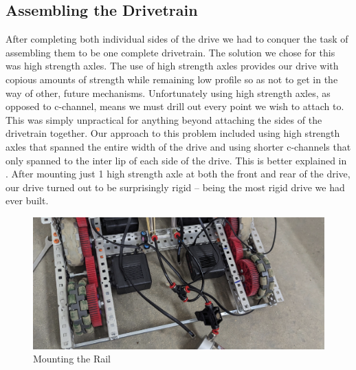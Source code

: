 \subsection*{Assembling the Drivetrain}
After completing both individual sides of the drive we had to conquer the task of assembling them to be one complete drivetrain. The solution we chose for this was high strength axles. The use of high strength axles provides our drive with copious amounts of strength while remaining low profile so as not to get in the way of other, future mechanisms. Unfortunately using high strength axles, as opposed to c-channel, means we must drill out every point we wish to attach to. This was simply unpractical for anything beyond attaching the sides of the drivetrain together. Our approach to this problem included using high strength axles that spanned the entire width of the drive and using shorter c-channels that only spanned to the inter lip of each side of the drive. This is better explained in . After mounting just 1 high strength axle at both the front and rear of the drive, our drive turned out to be surprisingly rigid -- being the most rigid drive we had ever built.
\begin{figure}[h]
    \centering
    \includegraphics[width=1\linewidth]{images/Mounting Rails HS Axles.png}
    \caption{Mounting the Rail}
    \label{fig:mounting-rails-hs-axles}
\end{figure}
